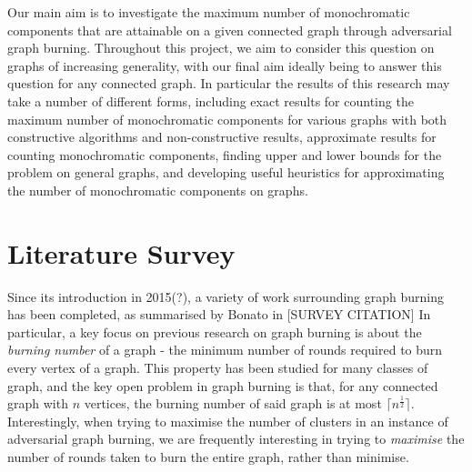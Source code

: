 \documentclass{mprop}
\begin{document}
Our main aim is to investigate the maximum number of monochromatic components that are attainable on a given connected graph through adversarial graph burning. Throughout this project, we aim to consider this question on graphs of increasing generality, with our final aim ideally being to answer this question for any connected graph. In particular the results of this research may take a number of different forms, including exact results for counting the maximum number of monochromatic components for various graphs with both constructive algorithms and non-constructive results, approximate results for counting monochromatic components, finding upper and lower bounds for the problem on general graphs, and developing useful heuristics for approximating the number of monochromatic components on graphs.
\section{Literature Survey}

Since its introduction in 2015(?), a variety of work surrounding graph burning has been completed, as summarised by Bonato in [SURVEY CITATION] In particular, a key focus on previous research on graph burning is about the \emph{burning number} of a graph - the minimum number of rounds required to burn every vertex of a graph. This property has been studied for many classes of graph, and the key open problem in graph burning is that, for any connected graph with $n$ vertices, the burning number of said graph is at most $\lceil n^\frac{1}{2} \rceil$. Interestingly, when trying to maximise the number of clusters in an instance of adversarial graph burning, we are frequently interesting in trying to \emph{maximise} the number of rounds taken to burn the entire graph, rather than minimise.
\end{document}
